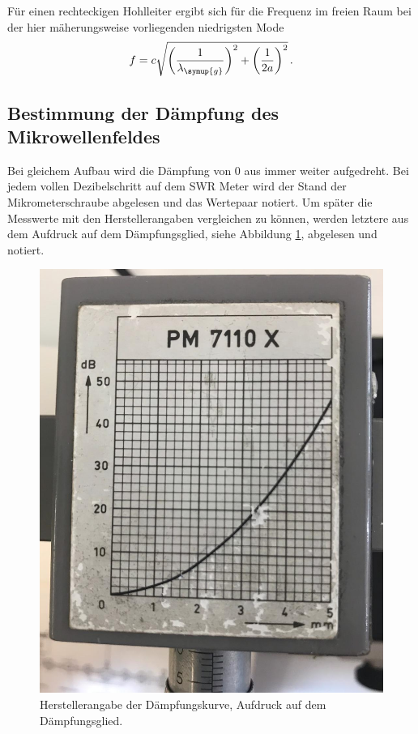 Für einen rechteckigen Hohlleiter ergibt sich für die Frequenz im freien Raum
bei der hier mäherungsweise vorliegenden niedrigsten Mode
\begin{equation}
  f=c \sqrt{\left(\frac{1}{\lambda_{\symup{g}}}\right)^2+\left(\frac{1}{2a}\right)^2} \,.
\end{equation}

\subsection{Bestimmung der Dämpfung des Mikrowellenfeldes}
\label{subsec:dämpfung}
Bei gleichem Aufbau wird die Dämpfung von 0 aus immer weiter aufgedreht. Bei jedem
vollen Dezibelschritt auf dem SWR Meter wird der Stand der Mikrometerschraube
abgelesen und das Wertepaar notiert. Um später die Messwerte mit den Herstellerangaben vergleichen zu können, werden letztere aus dem Aufdruck auf dem Dämpfungsglied, siehe Abbildung \ref{fig:aufdruckDaempfung}, abgelesen und notiert.

\begin{figure}
  \centering
  \includegraphics[width=\textwidth]{data/theorieDaempfung.png}
  \caption{Herstellerangabe der Dämpfungskurve, Aufdruck auf dem Dämpfungsglied.}
  \label{fig:aufdruckDaempfung}
\end{figure}

